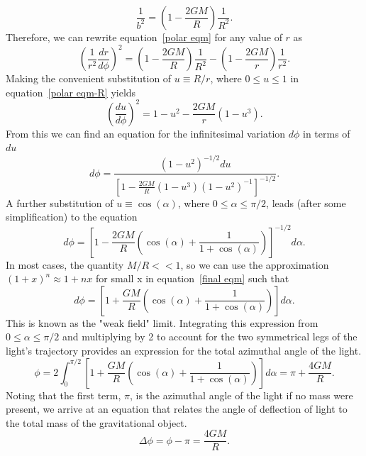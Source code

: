 \begin{equation} 
\frac{1}{b^2} = \left(1-\frac{2GM}{R}\right)\frac{1}{R^2}.
\end{equation} 
Therefore, we can rewrite equation~\ref{polar eqm} for any value of $r$ as
\begin{equation} \label{polar eqm-R}
\left(\frac{1}{r^2} \frac{dr}{d \phi}\right)^2 = \left(1-\frac{2GM}{R}\right)\frac{1}{R^2} - \left(1-\frac{2GM}{r}\right)\frac{1}{r^2}.
\end{equation}
Making the convenient substitution of $u \equiv R/r$, where $0 \leq u \leq 1$ in equation~\ref{polar eqm-R} yields 
\begin{equation} \label{polar eqm-u}
\left(\frac{du}{d\phi} \right)^2 = 1- u^2 - \frac{2GM}{r}(1-u^3).
\end{equation}
From this we can find an equation for the infinitesimal variation $d\phi$ in terms of $du$
\begin{equation} \label{dphi eqm}
d\phi = \frac{(1-u^2)^{-1/2}du}{\left[1 - \frac{2GM}{R}(1-u^3)(1-u^2)^{-1}\right]^{-1/2}}.
\end{equation}
A further substitution of $u \equiv \cos(\alpha)$, where $0 \leq \alpha \leq \pi/2$, leads (after some simplification) to the equation
\begin{equation} \label{final eqm}
d\phi = \left[1-\frac{2GM}{R}\left(\cos(\alpha) + \frac{1}{1+\cos(\alpha)}\right)\right]^{-1/2} d\alpha.
\end{equation}
\newpage
In most cases, the quantity $M/R<<1$, so we can use the approximation $(1+x)^n \approx 1+nx$ for small x in equation~\ref{final eqm} such that
\begin{equation}
d\phi = \left[1 + \frac{GM}{R} \left(\cos(\alpha) + \frac{1}{1+\cos(\alpha)}\right)\right]d\alpha.
\end{equation}
This is known as the "weak field" limit.  Integrating this expression from $0 \leq \alpha \leq \pi/2$ and multiplying by 2 to account for the two symmetrical legs of the light's trajectory provides an expression for the total azimuthal angle of the light.
\begin{equation} \label{polar angle}
\phi = 2 \int_{0}^{\pi/2} \left[1 + \frac{GM}{R} \left(\cos(\alpha) + \frac{1}{1+\cos(\alpha)}\right)\right] d\alpha = \pi + \frac{4GM}{R}.
\end{equation}
Noting that the first term, $\pi$, is the azimuthal angle of the light if no mass were present, we arrive at an equation that relates the angle of deflection of light to the total mass of the gravitational object. 
\begin{equation} \label{final GR}
\Delta \phi = \phi - \pi = \frac{4GM}{R} .
\end{equation}


